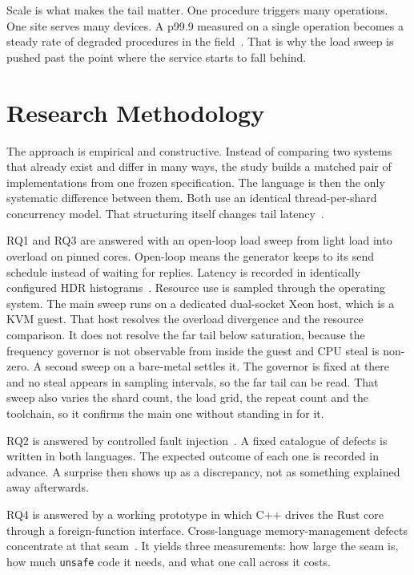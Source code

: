 \documentclass[english,twoside,openright,a4paper,censored,csm,software-track-2020]{HYthesisML}
\begin{document}
Scale is what makes the tail matter. One procedure triggers many operations. One site
serves many devices. A p99.9 measured on a single operation becomes a steady rate of
degraded procedures in the field~\cite{dean2013tail}. That is why the load sweep is
pushed past the point where the service starts to fall behind.

\chapter{Research Methodology\label{chapter:methodology}}

The approach is empirical and constructive. Instead of comparing two systems that
already exist and differ in many ways, the study builds a matched pair of
implementations from one frozen specification. The language is then the only systematic
difference between them. Both use an identical thread-per-shard concurrency model. That
structuring itself changes tail latency~\cite{enberg2019threadpercore}.

RQ1 and RQ3 are answered with an open-loop load sweep from light load into overload on
pinned cores. Open-loop means the generator keeps to its send schedule instead of
waiting for replies. Latency is recorded in identically configured HDR
histograms~\cite{tene_hdrhistogram}. Resource use is sampled through the operating
system. The main sweep runs on a dedicated dual-socket Xeon host, which is a KVM guest.
That host resolves the overload divergence and the resource comparison. It does not
resolve the far tail below saturation, because the frequency governor is not observable
from inside the guest and CPU steal is non-zero. A second sweep on a bare-metal
\BmCpu{} settles it. The governor is fixed at \BmGovernor{} there and no steal appears
in \BmStealIntervals{} sampling intervals, so the far tail can be read. That sweep also
varies the shard count, the load grid, the repeat count and the toolchain, so it
confirms the main one without standing in for it.

RQ2 is answered by controlled fault injection~\cite{natella2016fault}. A fixed catalogue
of defects is written in both languages. The expected outcome of each one is recorded in
advance. A surprise then shows up as a discrepancy, not as something explained away
afterwards.

RQ4 is answered by a working prototype in which C++ drives the Rust core through a
foreign-function interface. Cross-language memory-management defects concentrate at that
seam~\cite{li2022crosslang}. It yields three measurements: how large the seam is, how
much \texttt{unsafe} code it needs, and what one call across it costs.
\end{document}
